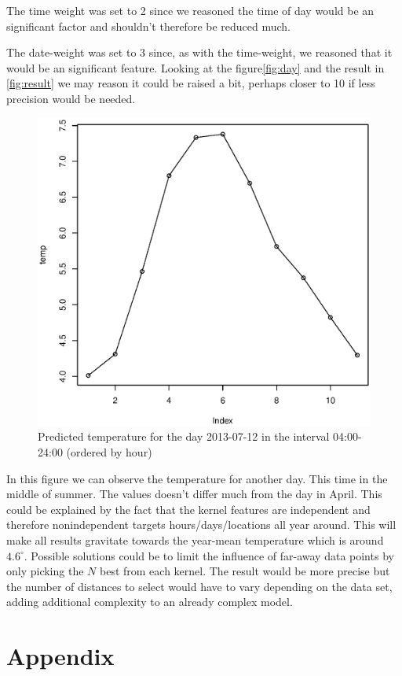 \documentclass[a4paper, 12pt]{article}
\begin{document}
    The time weight was set to 2 since we reasoned the time of day would be an significant factor and shouldn't therefore be reduced much. 

    The date-weight was set to 3 since, as with the time-weight, we reasoned that it would be an significant feature. Looking at the figure\ref{fig:day} and the result in \ref{fig:result} we may reason it could be raised a bit, perhaps closer to 10 if less precision would be needed.

    \begin{figure}[H]
    \centering
    \caption{Predicted temperature for the day 2013-07-12 in the interval 04:00-24:00 (ordered by hour)\label{fig:bad_result}}
        \begin{minipage}[]{0.4\textwidth}
            \includegraphics[width=\textwidth]{share/bad_result.eps}
        \end{minipage}
    \end{figure}
    In this figure we can observe the temperature for another day. This time in the middle of summer. The values doesn't differ much from the day in April. This could be explained by the fact that the kernel features are independent and therefore nonindependent targets hours/days/locations all year around. This will make all results gravitate towards the year-mean temperature which is around \(4.6^\circ\). Possible solutions could be to limit the influence of far-away data points by only picking the \(N\) best from each kernel. The result would be more precise but the number of distances to select would have to vary depending on the data set, adding additional complexity to an already complex model.

    \nocite{*} %
    
    
    \onecolumn \appendix
    \section*{Appendix}
    


    
\end{document}

